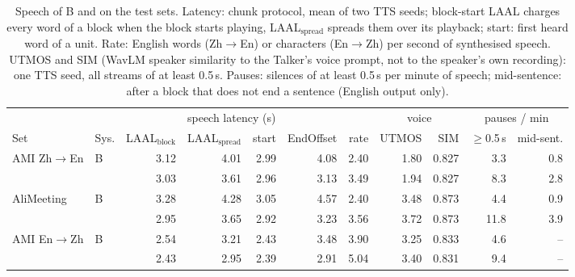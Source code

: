 \begin{table}[t]
\centering\small
\setlength{\tabcolsep}{3.5pt}
\begin{tabular}{llrrrrrrrrr}
\toprule
 & & \multicolumn{4}{c}{speech latency (s)} & & \multicolumn{2}{c}{voice} & \multicolumn{2}{c}{pauses / min} \\
\cmidrule(lr){3-6}\cmidrule(lr){8-9}\cmidrule(lr){10-11}
Set & Sys. & LAAL$_\text{block}$ & LAAL$_\text{spread}$ & start & EndOffset & rate & UTMOS & SIM & $\ge$0.5\,s & mid-sent. \\
\midrule
AMI Zh$\rightarrow$En & B & 3.12 & 4.01 & 2.99 & 4.08 & 2.40 & 1.80 & 0.827 & 3.3 & 0.8 \\
 & \sys{} & 3.03 & 3.61 & 2.96 & 3.13 & 3.49 & 1.94 & 0.827 & 8.3 & 2.8 \\
\midrule
AliMeeting & B & 3.28 & 4.28 & 3.05 & 4.57 & 2.40 & 3.48 & 0.873 & 4.4 & 0.9 \\
 & \sys{} & 2.95 & 3.65 & 2.92 & 3.23 & 3.56 & 3.72 & 0.873 & 11.8 & 3.9 \\
\midrule
AMI En$\rightarrow$Zh & B & 2.54 & 3.21 & 2.43 & 3.48 & 3.90 & 3.25 & 0.833 & 4.6 & -- \\
 & \sys{} & 2.43 & 2.95 & 2.39 & 2.91 & 5.04 & 3.40 & 0.831 & 9.4 & -- \\
\bottomrule
\end{tabular}
\caption{Speech of B and \sys{} on the test sets. Latency: chunk protocol, mean of two TTS seeds; block-start LAAL charges every word of a block when the block starts playing, LAAL$_\text{spread}$ spreads them over its playback; start: first heard word of a unit. Rate: English words (Zh$\rightarrow$En) or characters (En$\rightarrow$Zh) per second of synthesised speech. UTMOS and SIM (WavLM speaker similarity to the Talker's voice prompt, not to the speaker's own recording): one TTS seed, all streams of at least 0.5\,s. Pauses: silences of at least 0.5\,s per minute of speech; mid-sentence: after a block that does not end a sentence (English output only).}
\label{tab:speech}
\end{table}

